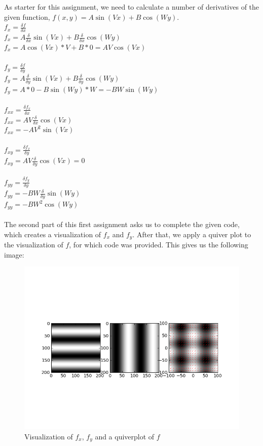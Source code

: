 \documentclass[10pt,a4paper]{article}
\begin{document}
As starter for this assignment, we need to calculate a number of
derivatives of the given function, $f(x,y) = A\sin(Vx) + B\cos(Wy)$.\\
$f_x = \frac{\delta f}{\delta x}$\\
$f_x = A\frac{\delta}{\delta x} \sin(Vx) + B\frac{\delta}{\delta x} \cos(Wy)$\\
$f_x = A\cos(Vx) * V + B * 0 = AV\cos(Vx)$\\
\\
$f_y = \frac{\delta f}{\delta y}$\\
$f_y = A \frac{\delta}{\delta y}\sin(Vx) + B \frac{\delta}{\delta y}\cos(Wy)$ \\
$f_y = A * 0 - B\sin(Wy) * W = -BW\sin(Wy)$ \\
\\
$f_{xx} = \frac{\delta f_x}{\delta x}$\\
$f_{xx} = AV \frac{\delta}{\delta x}\cos(Vx)$ \\
$f_{xx} = -AV^2\sin(Vx)$\\
\\
$f_{xy} = \frac{\delta f_x}{\delta y}$ \\
$f_{xy} = AV \frac{\delta}{\delta y}\cos(Vx) = 0$ \\
\\
$f_{yy} = \frac{\delta f_y}{\delta y}$ \\
$f_{yy} = -BW \frac{\delta}{\delta y}\sin(Wy)$ \\
$f_{yy} = -BW^2\cos(Wy)$ \\
\\
The second part of this first assignment asks us to complete the
given code, which creates a visualization of $f_x$ and $f_y$.
After that, we apply a quiver plot to the visualization of $f$, for
which code was provided. This gives us the following image:
\begin{figure}[H]
	\includegraphics[scale=0.6]{quiver.png}
	\caption{Visualization of $f_x$, $f_y$ and a quiverplot of $f$}
\end{figure}
\end{document}
